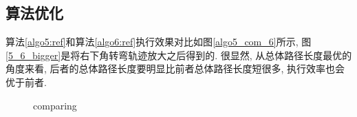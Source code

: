     \subsection{算法优化} 
    算法\ref{algo5:ref}和算法\ref{algo6:ref}执行效果对比如图\ref{algo5_com_6}所示, 图\ref{5_6_bigger}是将右下角转弯轨迹放大之后得到的. 很显然, 从总体路径长度最优的角度来看, 后者的总体路径长度要明显比前者总体路径长度短很多, 执行效率也会优于前者.
    \begin{figure}[h]
        \centering
        \caption{comparing}
    \end{figure}

